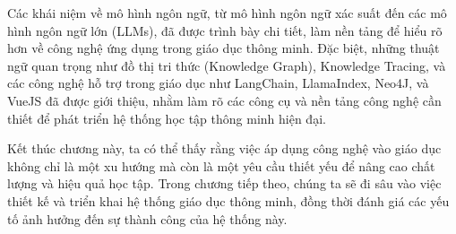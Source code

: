 \par Các khái niệm về mô hình ngôn ngữ, từ mô hình ngôn ngữ xác suất đến các mô hình ngôn ngữ lớn (LLMs), đã được trình bày chi tiết, làm nền tảng để hiểu rõ hơn về công nghệ ứng dụng trong giáo dục thông minh. Đặc biệt, những thuật ngữ quan trọng như đồ thị tri thức (Knowledge Graph), Knowledge Tracing, và các công nghệ hỗ trợ trong giáo dục như LangChain, LlamaIndex, Neo4J, và VueJS đã được giới thiệu, nhằm làm rõ các công cụ và nền tảng công nghệ cần thiết để phát triển hệ thống học tập thông minh hiện đại.

\par Kết thúc chương này, ta có thể thấy rằng việc áp dụng công nghệ vào giáo dục không chỉ là một xu hướng mà còn là một yêu cầu thiết yếu để nâng cao chất lượng và hiệu quả học tập. Trong chương tiếp theo, chúng ta sẽ đi sâu vào việc thiết kế và triển khai hệ thống giáo dục thông minh, đồng thời đánh giá các yếu tố ảnh hưởng đến sự thành công của hệ thống này.